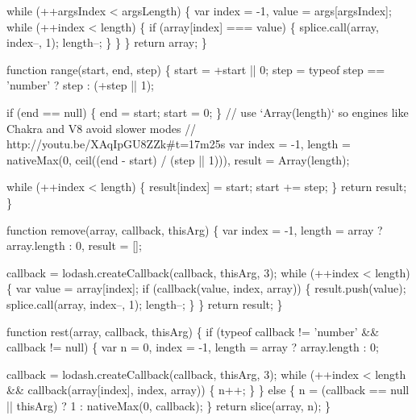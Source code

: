 \begin{DoxyCodeInclude}
      \textcolor{keywordflow}{while} (++argsIndex < argsLength) \{
        var index = -1,
            value = args[argsIndex];
        \textcolor{keywordflow}{while} (++index < length) \{
          \textcolor{keywordflow}{if} (array[index] === value) \{
            splice.call(array, index--, 1);
            length--;
          \}
        \}
      \}
      \textcolor{keywordflow}{return} array;
    \}

    \textcolor{keyword}{function} range(start, end, step) \{
      start = +start || 0;
      step = typeof step == \textcolor{stringliteral}{'number'} ? step : (+step || 1);

      \textcolor{keywordflow}{if} (end == null) \{
        end = start;
        start = 0;
      \}
      \textcolor{comment}{// use `Array(length)` so engines like Chakra and V8 avoid slower modes}
      \textcolor{comment}{// http://youtu.be/XAqIpGU8ZZk#t=17m25s}
      var index = -1,
          length = nativeMax(0, ceil((end - start) / (step || 1))),
          result = Array(length);

      \textcolor{keywordflow}{while} (++index < length) \{
        result[index] = start;
        start += step;
      \}
      \textcolor{keywordflow}{return} result;
    \}

    \textcolor{keyword}{function} \textcolor{keyword}{remove}(array, callback, thisArg) \{
      var index = -1,
          length = array ? array.length : 0,
          result = [];

      callback = lodash.createCallback(callback, thisArg, 3);
      \textcolor{keywordflow}{while} (++index < length) \{
        var value = array[index];
        \textcolor{keywordflow}{if} (callback(value, index, array)) \{
          result.push(value);
          splice.call(array, index--, 1);
          length--;
        \}
      \}
      \textcolor{keywordflow}{return} result;
    \}

    \textcolor{keyword}{function} rest(array, callback, thisArg) \{
      \textcolor{keywordflow}{if} (typeof callback != \textcolor{stringliteral}{'number'} && callback != null) \{
        var n = 0,
            index = -1,
            length = array ? array.length : 0;

        callback = lodash.createCallback(callback, thisArg, 3);
        \textcolor{keywordflow}{while} (++index < length && callback(array[index], index, array)) \{
          n++;
        \}
      \} \textcolor{keywordflow}{else} \{
        n = (callback == null || thisArg) ? 1 : nativeMax(0, callback);
      \}
      \textcolor{keywordflow}{return} slice(array, n);
    \}


\end{DoxyCodeInclude}
